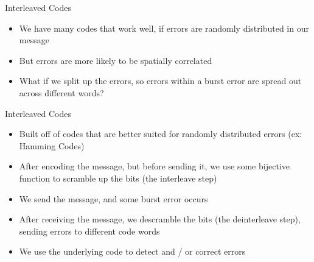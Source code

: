 \documentclass[aspectratio=169]{beamer}
\begin{document}
\begin{frame}{Interleaved Codes}
    \begin{itemize}
        \item We have many codes that work well, if errors are randomly distributed in our message
        \item But errors are more likely to be spatially correlated \pause
        \item What if we split up the errors, so errors within a burst error are spread out across different words?
    \end{itemize}
\end{frame}


\begin{frame}{Interleaved Codes}
    \begin{itemize}
        \item Built off of codes that are better suited for randomly distributed errors (ex: Hamming Codes) \pause
        \item After encoding the message, but before sending it, we use some bijective function to scramble up the bits (the interleave step) \pause
        \item We send the message, and some burst error occurs \pause
        \item After receiving the message, we descramble the bits (the deinterleave step), sending errors to different code words \pause
        \item We use the underlying code to detect and / or correct errors
    \end{itemize}
\end{frame}
\end{document}
